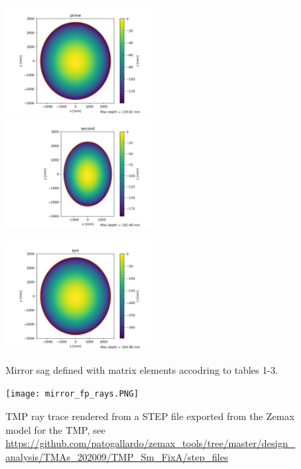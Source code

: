 \documentclass[12pt, letterpaper, twoside]{article}
\begin{document}
\begin{figure}
	\centering
	\includegraphics[width=0.5\textwidth]{./prime.png}\hfill
	\includegraphics[width=0.5\textwidth]{./second.png}
	
	\includegraphics[width=0.5\textwidth]{./tert.png}
	\label{fig:mirrorshape}
	\caption{Mirror sag defined with matrix elements accodring to tables 1-3.}
\end{figure}

\begin{figure}
	\centering
	\texttt{[image: mirror\_fp\_rays.PNG]}
	\caption{TMP ray trace rendered from a STEP file exported from the Zemax model for the TMP, see \url{https://github.com/patogallardo/zemax_tools/tree/master/design_analysis/TMAs_202009/TMP_Sm_FixA/step_files}}
\end{figure}
\end{document}
